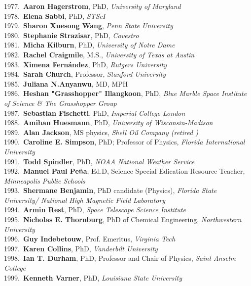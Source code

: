 1977.~{\bf Aaron Hagerstrom}, PhD, {\sl University of Maryland} \\
1978.~{\bf Elena Sabbi}, PhD, {\sl STScI} \\
1979.~{\bf Sharon Xuesong Wang}, {\sl Penn State University} \\
1980.~{\bf Stephanie Strazisar}, PhD, {\sl Covestro} \\
1981.~{\bf Micha Kilburn}, PhD, {\sl University of Notre Dame} \\
1982.~{\bf Rachel Craigmile}, M.S., {\sl University of Texas at Austin} \\
1983.~{\bf Ximena Fern\'{a}ndez}, PhD, {\sl Rutgers University} \\
1984.~{\bf Sarah Church}, Professor, {\sl Stanford University} \\
1985.~{\bf Juliana N.Anyanwu}, MD, MPH \\
1986.~{\bf Heshan "Grasshopper" Illangkoon}, PhD, {\sl Blue Marble Space Institute of Science \& The Grasshopper Group} \\
1987.~{\bf Sebastian Fischetti}, PhD, {\sl Imperial College London} \\
1988.~{\bf Amihan Huesmann}, PhD, {\sl University of Wisconsin-Madison} \\
1989.~{\bf Alan Jackson}, MS physics, {\sl Shell Oil Company  (retired ) } \\
1990.~{\bf Caroline E. Simpson}, PhD; Professor of Physics, {\sl Florida International University} \\
1991.~{\bf Todd Spindler}, PhD, {\sl NOAA National Weather Service} \\
1992.~{\bf Manuel Paul Pe\~{n}a}, Ed.D, Science Special Edication Resource Teacher, {\sl Minneapolis Public Schools} \\
1993.~{\bf Shermane Benjamin}, PhD candidate (Physics), {\sl Florida State University/ National High Magnetic Field Laboratory} \\
1994.~{\bf Armin Rest}, PhD, {\sl Space Telescope Science Institute} \\
1995.~{\bf Nicholas E. Thornburg}, PhD of Chemical Engineering, {\sl Northwestern University} \\
1996.~{\bf Guy Indebetouw}, Prof. Emeritus, {\sl Virginia Tech} \\
1997.~{\bf Karen Collins}, PhD, {\sl Vanderbilt University} \\
1998.~{\bf Ian T. Durham}, PhD, Professor and Chair of Physics, {\sl Saint Anselm College} \\
1999.~{\bf Kenneth Varner}, PhD, {\sl Louisiana State University} \\
